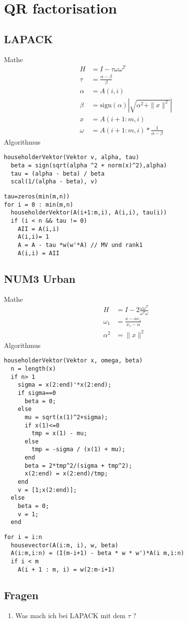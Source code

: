 \chapter{QR factorisation}

\section{LAPACK}
Mathe \cite{DGEQR2}
\begin{align}
	H &= I - \tau \omega \omega^T \\
	\tau &= \frac{\alpha - \beta}{\beta} \\
	\alpha &= A(i,i)\\
	\beta &= \text{sign}(\alpha) \left|\sqrt{\alpha^2 + \|x\|^2}\right|\\
	x &= A(i+1:m,i)\\
	\omega &= A(i+1:m,i) * \frac{1}{\alpha - \beta}
\end{align}
Algorithmus
\begin{lstlisting}
householderVektor(Vektor v, alpha, tau)
  beta = sign(sqrt(alpha ^2 + norm(x)^2),alpha)
  tau = (alpha - beta) / beta	
  scal(1/(alpha - beta), v)
\end{lstlisting}
\begin{lstlisting}
tau=zeros(min(m,n))
for i = 0 : min(m,n)
  householderVektor(A(i+1:m,i), A(i,i), tau(i)) 
  if (i < n && tau != 0)
    AII = A(i,i)
    A(i,i)= 1
    A = A - tau *w(w'*A) // MV und rank1
    A(i,i) = AII
\end{lstlisting}

\section{NUM3 Urban}
Mathe
\begin{align}
	H &= I - 2 \frac{\omega \omega^T}{\omega^T \omega}\\
	\omega_1 &= \frac{x - \alpha e_1}{x_1 - \alpha}\\
	\alpha ^2 &= \|x\|^2 
\end{align}
Algorithmus
\begin{lstlisting}
householderVektor(Vektor x, omega, beta)
  n = length(x)
  if n> 1
    sigma = x(2:end)'*x(2:end);
    if sigma==0
      beta = 0;
    else
      mu = sqrt(x(1)^2+sigma);
      if x(1)<=0
        tmp = x(1) - mu;
      else
        tmp = -sigma / (x(1) + mu);
      end
      beta = 2*tmp^2/(sigma + tmp^2);
      x(2:end) = x(2:end)/tmp;
    end
    v = [1;x(2:end)];
  else
    beta = 0;
    v = 1;
  end
\end{lstlisting}

\begin{lstlisting}
for i = i:n
  housevector(A(i:m, i), w, beta)
  A(i:m,i:n) = (I(m-i+1) - beta * w * w')*A(i m,i:n)
  if i < m
    A(i + 1 : m, i) = w(2:m-i+1)
\end{lstlisting}



\section{Fragen}
\begin{enumerate}
	\item Was mach ich bei LAPACK mit dem $ \tau $ ?
\end{enumerate}

